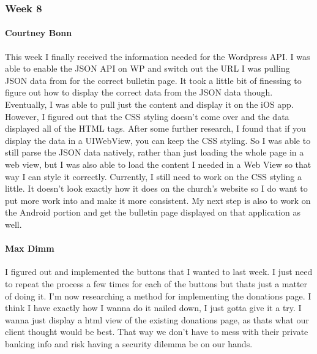 		\subsubsection{Week 8}
		
			\paragraph{Courtney Bonn}
			This week I finally received the information needed for the Wordpress API. I was able to enable the JSON API on WP and switch out the URL I was pulling JSON data from for the correct bulletin page. It took a little bit of finessing to figure out how to display the correct data from the JSON data though. Eventually, I was able to pull just the content and display it on the iOS app. However, I figured out that the CSS styling doesn't come over and the data displayed all of the HTML tags. After some further research, I found that if you display the data in a UIWebView, you can keep the CSS styling. So I was able to still parse the JSON data natively, rather than just loading the whole page in a web view, but I was also able to load the content I needed in a Web View so that way I can style it correctly. Currently, I still need to work on the CSS styling a little. It doesn't look exactly how it does on the church's website so I do want to put more work into and make it more consistent. My next step is also to work on the Android portion and get the bulletin page displayed on that application as well.

			\paragraph{Max Dimm}
			I figured out and implemented the buttons that I wanted to last week. I just need to repeat the process a few times for each of the buttons but thats just a matter of doing it. I'm now researching a method for implementing the donations page. I think I have exactly how I wanna do it nailed down, I just gotta give it a try. I wanna just display a html view of the existing donations page, as thats what our client thought would be best. That way we don't have to mess with their private banking info and risk having a security dilemma be on our hands.
			
